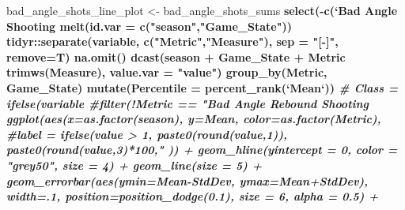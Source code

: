 \documentclass[]{article}
\newenvironment{Shaded}{\begin{snugshade}}{\end{snugshade}}
\newcommand{\KeywordTok}[1]{\textcolor[rgb]{0.13,0.29,0.53}{\textbf{#1}}}
\newcommand{\DataTypeTok}[1]{\textcolor[rgb]{0.13,0.29,0.53}{#1}}
\newcommand{\DecValTok}[1]{\textcolor[rgb]{0.00,0.00,0.81}{#1}}
\newcommand{\FloatTok}[1]{\textcolor[rgb]{0.00,0.00,0.81}{#1}}
\newcommand{\StringTok}[1]{\textcolor[rgb]{0.31,0.60,0.02}{#1}}
\newcommand{\CommentTok}[1]{\textcolor[rgb]{0.56,0.35,0.01}{\textit{#1}}}
\newcommand{\OperatorTok}[1]{\textcolor[rgb]{0.81,0.36,0.00}{\textbf{#1}}}
\newcommand{\NormalTok}[1]{#1}
\begin{document}
\begin{Shaded}
\begin{Highlighting}[]
{{{{{{{{{{{{{{{{{{{{\NormalTok{bad_angle_shots_line_plot <-}\StringTok{ }\NormalTok{bad_angle_shots_sums }\OperatorTok{%>%}
\StringTok{    }\KeywordTok{select}\NormalTok{(}\OperatorTok{-}\KeywordTok{c}\NormalTok{(}\StringTok{`}\DataTypeTok{Bad Angle Shooting % - Expected}\StringTok{`}\NormalTok{,}\StringTok{`}\DataTypeTok{Bad Angle Rebound % - Expected}\StringTok{`}\NormalTok{)) }\OperatorTok{%>%}
\StringTok{    }\KeywordTok{melt}\NormalTok{(}\DataTypeTok{id.var =} \KeywordTok{c}\NormalTok{(}\StringTok{"season"}\NormalTok{,}\StringTok{"Game_State"}\NormalTok{)) }\OperatorTok{%>%}
\StringTok{    }\NormalTok{tidyr}\OperatorTok{::}\KeywordTok{separate}\NormalTok{(variable, }\KeywordTok{c}\NormalTok{(}\StringTok{"Metric"}\NormalTok{,}\StringTok{"Measure"}\NormalTok{), }\DataTypeTok{sep =} \StringTok{"[-]"}\NormalTok{, }\DataTypeTok{remove=}\NormalTok{T) }\OperatorTok{%>%}
\StringTok{    }\KeywordTok{na.omit}\NormalTok{() }\OperatorTok{%>%}
\StringTok{    }\KeywordTok{dcast}\NormalTok{(season }\OperatorTok{+}\StringTok{ }\NormalTok{Game_State }\OperatorTok{+}\StringTok{ }\NormalTok{Metric }\OperatorTok{~}\StringTok{ }\KeywordTok{trimws}\NormalTok{(Measure), }\DataTypeTok{value.var =} \StringTok{"value"}\NormalTok{) }\OperatorTok{%>%}
\StringTok{    }\KeywordTok{group_by}\NormalTok{(Metric, Game_State) }\OperatorTok{%>%}
\StringTok{    }\KeywordTok{mutate}\NormalTok{(}\DataTypeTok{Percentile =} \KeywordTok{percent_rank}\NormalTok{(}\StringTok{`}\DataTypeTok{Mean}\StringTok{`}\NormalTok{)) }\OperatorTok{%>%}
\StringTok{    }\CommentTok{#       Class = ifelse(variable %in% c("Bad Angle Shooting % - Expected","Bad Angle Rebound % - Expected"), "Delta Measure", "Percentage Measure")) %>%}
\StringTok{    }\CommentTok{#filter(!Metric == "Bad Angle Rebound Shooting % ") %>%}
\StringTok{    }\KeywordTok{ggplot}\NormalTok{(}\KeywordTok{aes}\NormalTok{(}\DataTypeTok{x=}\KeywordTok{as.factor}\NormalTok{(season), }\DataTypeTok{y=}\NormalTok{Mean, }\DataTypeTok{color=}\KeywordTok{as.factor}\NormalTok{(Metric),}
               \CommentTok{#label = ifelse(value > 1, paste0(round(value,1)), paste0(round(value,3)*100,"%"))}
\NormalTok{               )) }\OperatorTok{+}
\StringTok{    }\KeywordTok{geom_hline}\NormalTok{(}\DataTypeTok{yintercept =} \DecValTok{0}\NormalTok{, }\DataTypeTok{color =} \StringTok{"grey50"}\NormalTok{, }\DataTypeTok{size =} \DecValTok{4}\NormalTok{) }\OperatorTok{+}
\StringTok{    }\KeywordTok{geom_line}\NormalTok{(}\DataTypeTok{size =} \DecValTok{5}\NormalTok{) }\OperatorTok{+}
\StringTok{    }\KeywordTok{geom_errorbar}\NormalTok{(}\KeywordTok{aes}\NormalTok{(}\DataTypeTok{ymin=}\NormalTok{Mean}\OperatorTok{-}\NormalTok{StdDev, }\DataTypeTok{ymax=}\NormalTok{Mean}\OperatorTok{+}\NormalTok{StdDev), }\DataTypeTok{width=}\NormalTok{.}\DecValTok{1}\NormalTok{, }\DataTypeTok{position=}\KeywordTok{position_dodge}\NormalTok{(}\FloatTok{0.1}\NormalTok{), }\DataTypeTok{size =} \DecValTok{6}\NormalTok{, }\DataTypeTok{alpha =} \FloatTok{0.5}\NormalTok{) }\OperatorTok{+}
}}}}}}}}}}}}}}}}}}}}}}}}}}}}}}}
\end{Highlighting}
\end{Shaded}
\end{document}
